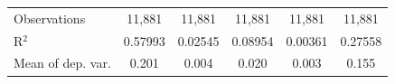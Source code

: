 \begin{tabular}{lccccc}
   Observations                                                          & 11,881                   & 11,881             & 11,881                    & 11,881             & 11,881\\  
   R$^2$                                                                 & 0.57993                  & 0.02545            & 0.08954                   & 0.00361            & 0.27558\\  
   Mean of dep. var.                                                     & 0.201                    & 0.004              & 0.020                     & 0.003              & 0.155\\  
\bottomrule
\end{tabular}

